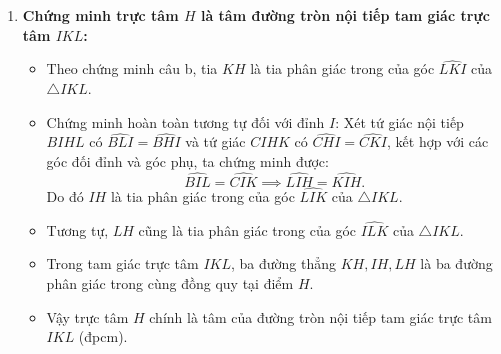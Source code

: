 \begin{ex}
{\begin{enumerate}[label=\textbf{\alph*)}]
    \item \textbf{Chứng minh trực tâm $H$ là tâm đường tròn nội tiếp tam giác trực tâm $IKL$:}
    \begin{itemize}
        \item Theo chứng minh câu b, tia $KH$ là tia phân giác trong của góc $\widehat{LKI}$ của $\triangle IKL$.
        \item Chứng minh hoàn toàn tương tự đối với đỉnh $I$:
        Xét tứ giác nội tiếp $BIHL$ có $\widehat{BLI} = \widehat{BHI}$ và tứ giác $CIHK$ có $\widehat{CHI} = \widehat{CKI}$, kết hợp với các góc đối đỉnh và góc phụ, ta chứng minh được:
        \[
        \widehat{BI L} = \widehat{CIK} \implies \widehat{LIH} = \widehat{KIH}.
        \]
        Do đó $IH$ là tia phân giác trong của góc $\widehat{LI K}$ của $\triangle IKL$.
        \item Tương tự, $LH$ cũng là tia phân giác trong của góc $\widehat{ILK}$ của $\triangle IKL$.
        \item Trong tam giác trực tâm $IKL$, ba đường thẳng $KH, IH, LH$ là ba đường phân giác trong cùng đồng quy tại điểm $H$.
        \item Vậy trực tâm $H$ chính là tâm của đường tròn nội tiếp tam giác trực tâm $IKL$ (đpcm).
    \end{itemize}
\end{enumerate}
}
\end{ex}
